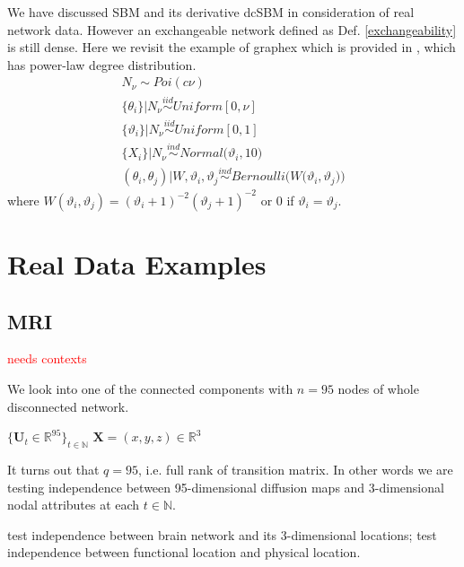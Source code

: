\documentclass[12pt]{article}
\theoremstyle{definition}
\begin{document}
We have discussed SBM and its derivative dcSBM in consideration of real network data. However an exchangeable network defined as Def. \ref{exchangeability} is still dense. Here we revisit the example of graphex which is provided in \cite{veitch2015class}, which has power-law degree distribution.
\begin{equation}
\begin{gathered}
N_{\nu} \sim Poi( c \nu) \\ 
\{ \theta_{i} \} \big| N_{\nu} \overset{iid}{\sim} Uniform[0, \nu]  \\ 
\{ \vartheta_{i} \} \big| N_{\nu} \overset{iid}{\sim} Uniform[0,1] \\ 
\{ X_{i}  \} | N_{\nu} \overset{ind}{\sim} Normal \big( \vartheta_{i}, 10 \big)  \\ 
(\theta_{i}, \theta_{j}) \big| W, \vartheta_{i}, \vartheta_{j} \overset{ind}{\sim} Bernoulli \big( W\big( \vartheta_{i}, \vartheta_{j} \big) \big) 
\end{gathered}
\end{equation}
where $W(\vartheta_{i}, \vartheta_{j} ) = (\vartheta_{i} + 1)^{-2} ( \vartheta_{j} + 1 )^{-2}$ or 0 if $\vartheta_{i} = \vartheta_{j}$. 



\section{Real Data Examples}
\label{sec:real}
	
\subsection{MRI}
	
\textcolor{red}{needs contexts}	
	
We look into one of the connected components with $n = 95$ nodes of whole disconnected network. 
	
$\{ \mathbf{U}_{t} \in \mathbb{R}^{95} \}_{t \in \mathbb{N}}$ $\mathbf{X} = (x,y,z) \in \mathbb{R}^{3}$
	
It turns out that $q=95$, i.e. full rank of transition matrix. In other words we are testing independence between 95-dimensional diffusion maps and 3-dimensional nodal attributes at each $t \in \mathbb{N}$.
	
	
test independence between brain network and its 3-dimensional locations; test independence between functional location and physical location. 
	
\end{document}
